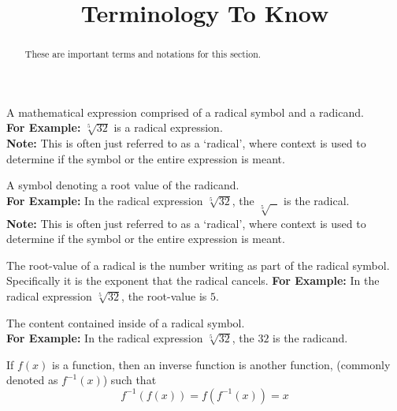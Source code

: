 \documentclass{ximera}
\title{Terminology To Know}
\begin{document}
\begin{abstract}
    These are important terms and notations for this section.
\end{abstract}
\maketitle

\begin{definition}
    A mathematical expression comprised of a radical symbol and a radicand. \\
    \textbf{For Example:} $\sqrt[5]{32}$ is a radical expression.\\
    \textbf{Note:} This is often just referred to as a `radical', where context is used to determine if the symbol or the entire expression is meant.
\end{definition} 

\begin{definition}
    A symbol denoting a root value of the radicand.\\
    \textbf{For Example:} In the radical expression $\sqrt[5]{32}$, the $\sqrt[5]{\text{     }}$ is the radical.\\
    \textbf{Note:} This is often just referred to as a `radical', where context is used to determine if the symbol or the entire expression is meant.
\end{definition} 

\begin{definition}
    The root-value of a radical is the number writing as part of the radical symbol. Specifically it is the exponent that the radical cancels.
    \textbf{For Example:} In the radical expression $\sqrt[5]{32}$, the root-value is $5$.
\end{definition} 

\begin{definition}[Radicand]
    The content contained inside of a radical symbol. \\
    \textbf{For Example:} In the radical expression $\sqrt[5]{32}$, the $32$ is the radicand.
\end{definition} 

\begin{definition}
    If $f(x)$ is a function, then an inverse function is another function, (commonly denoted as $f^{-1}(x)$) such that
    \[
        f^{-1}(f(x)) = f(f^{-1}(x)) = x
    \]
\end{definition} 
\end{document}
